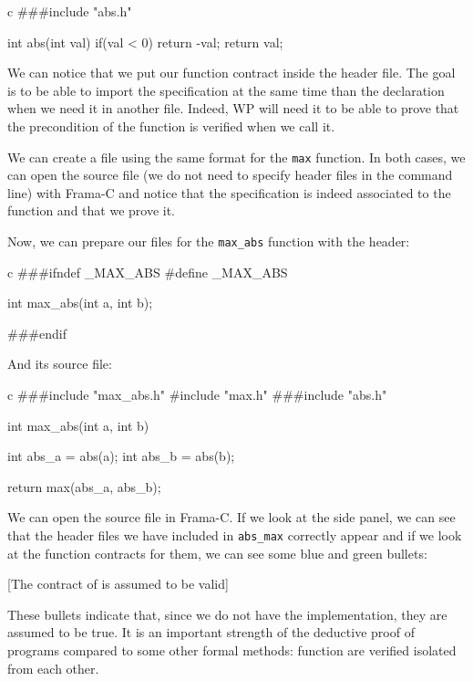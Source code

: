\documentclass[middle]{zmdocument}
\begin{document}
\begin{CodeBlock}{c}
###include "abs.h"

int abs(int val){
  if(val < 0) return -val;
  return val;
}
\end{CodeBlock}



We can notice that we put our function contract inside the header file.
The goal is to be able to import the specification at the same time than
the declaration when we need it in another file. Indeed, WP will need it
to be able to prove that the precondition of the function is verified
when we call it.

We can create a file using the same format for the \texttt{max}
function. In both cases, we can open the source file (we do not need to
specify header files in the command line) with Frama-C and notice that
the specification is indeed associated to the function and that we prove
it.


Now, we can prepare our files for the \texttt{max\_abs} function with
the header:


\begin{CodeBlock}{c}
###ifndef _MAX_ABS
#define _MAX_ABS

int max_abs(int a, int b);

###endif
\end{CodeBlock}



And its source file:



\begin{CodeBlock}{c}
###include "max_abs.h"
#include "max.h"
###include "abs.h"

int max_abs(int a, int b){
  int abs_a = abs(a);
  int abs_b = abs(b);

  return max(abs_a, abs_b);
}
\end{CodeBlock}



We can open the source file in Frama-C. If we look at the side panel, we
can see that the header files we have included in \texttt{abs\_max}
correctly appear and if we look at the function contracts for them, we
can see some blue and green bullets:



[The contract of  is assumed to be valid]


These bullets indicate that, since we do not have the implementation,
they are assumed to be true. It is an important strength of the
deductive proof of programs compared to some other formal methods:
function are verified isolated from each other.
\end{document}
